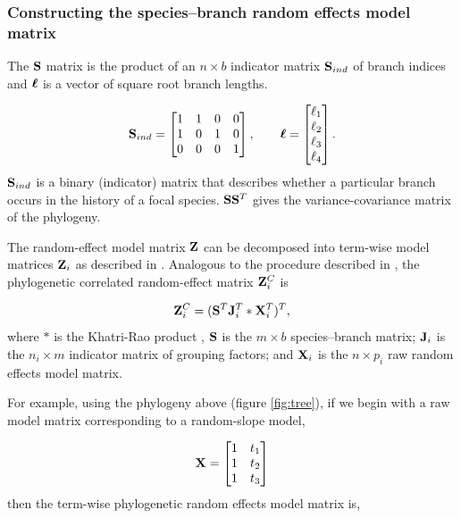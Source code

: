 \documentclass[12pt]{article}
\begin{document}
\subsubsection*{Constructing the species--branch random effects model matrix}

The ${\mathbf S}$ matrix is the product of an $n \times b$ indicator matrix ${\mathbf S}_{ind}$ of branch indices and ${\boldsymbol \ell}$ is a vector of square root branch lengths.

\begin{align}
{\mathbf S}_{ind} = \begin{bmatrix}
1 & 1 & 0 & 0 \\ 
1 & 0 & 1 & 0 \\ 
0 & 0 & 0 & 1
\end{bmatrix} , 
\qquad
{\boldsymbol \ell} = \begin{bmatrix}
\ell_1 \\
\ell_2 \\
\ell_3 \\
\ell_4 
\end{bmatrix} .
\label{eq:S}
\end{align}
${\mathbf S}_{ind}$ is a binary (indicator) matrix that describes whether a particular branch occurs in the history of a focal species. 
${\mathbf S} {\mathbf S}^T$ gives the variance-covariance matrix of the phylogeny. 

The random-effect model matrix ${\mathbf Z}$ can be decomposed into term-wise model matrices ${\mathbf Z}_{i}$ as described in \citet{bates2015fitting}.
Analogous to the procedure described in \citet{bates2015fitting}, the phylogenetic correlated random-effect matrix ${\mathbf Z}^{C}_{i}$ is

\begin{equation}
{\mathbf Z}^{C}_{i} = ({\mathbf S}^{T}{\mathbf J}^{T}_{i} \ast {\mathbf X}^{T}_{i})^{T}, \label{eq:ZC}
\end{equation}
where $\ast$ is the Khatri-Rao product \citep{khatri1968solutions}, ${\mathbf S}$ is the $m \times b$ species--branch matrix; ${\mathbf J}_{i}$ is the $n_i \times m$ indicator matrix of grouping factors; and ${\mathbf X}_{i}$ is the $n \times p_{i}$ raw random effects model matrix. 

For example, using the phylogeny above (figure \ref{fig:tree}), if we begin with a raw model matrix corresponding to a random-slope model, 

\begin{align}
{\mathbf X} = \begin{bmatrix}
1 & t_1  \\ 
1 & t_2  \\ 
1 & t_3 
\end{bmatrix} 
\end{align}
then the term-wise phylogenetic random effects model matrix is,
\end{document}
